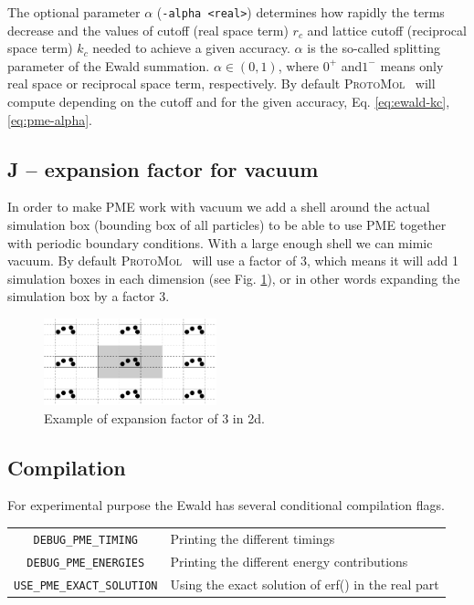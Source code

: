 \documentclass[11pt]{article}
\newcommand{\ProtoMol}{\textsc{ProtoMol }}
\begin{document}
The optional parameter $\alpha$ (\texttt{-alpha <real>}) determines how rapidly
the terms
decrease and the values of cutoff (real space term) $r_c$ and lattice
cutoff (reciprocal space term) $k_c$ needed to achieve a given
accuracy. $\alpha$ is the so-called splitting parameter of the Ewald
summation. $\alpha \in (0,1)$, where $0^+$ and$1^-$ means only real
space or reciprocal space term, respectively. By default \ProtoMol\ will compute depending on the cutoff and for
the given accuracy, Eq. \ref{eq:ewald-kc},\ref{eq:pme-alpha}.

\subsection{J -- expansion factor for vacuum}

In order to make PME work with vacuum we add a
shell around the actual simulation box (bounding box of all particles)
to be able to use PME together with periodic boundary conditions. With a large enough shell we can mimic vacuum. By default \ProtoMol\ will use a factor of 3, which
means it will add 1 simulation boxes in each dimension (see
Fig. \ref{fig:expansion}), or in other words expanding the simulation
box by a factor 3.
\begin{figure}[hbt]
  \centerline{\includegraphics[width=5cm]{expansion.pdf}}
  \caption{Example of expansion factor of 3 in 2d.}
  \label{fig:expansion}
\end{figure}


\subsection{Compilation}

For experimental purpose the Ewald has several conditional compilation
flags.\\
\begin{tabular}{cp{10cm}}
\texttt{\small DEBUG\_PME\_TIMING}        & Printing the different timings\\
\texttt{\small DEBUG\_PME\_ENERGIES}      & Printing the different energy contributions\\
\texttt{\small USE\_PME\_EXACT\_SOLUTION}& Using the exact solution of erf() in the real part\\
\end{tabular}
\end{document}
